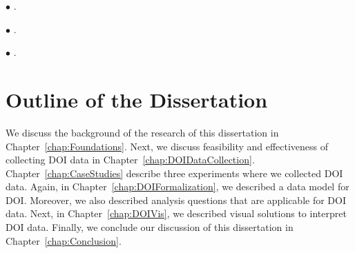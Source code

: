 $\bullet$ .    

$\bullet$ .

$\bullet$ .

\section{Outline of the Dissertation}
We discuss the background of the research of this dissertation in Chapter~\ref{chap:Foundations}. Next, we discuss feasibility and effectiveness of collecting DOI data in Chapter~\ref{chap:DOIDataCollection}. Chapter~\ref{chap:CaseStudies} describe three experiments where we collected DOI data. Again, in Chapter~\ref{chap:DOIFormalization}, we described a data model for DOI. Moreover, we also described analysis questions that are applicable for DOI data. Next, in Chapter~\ref{chap:DOIVis}, we described visual solutions to interpret DOI data. Finally, we conclude our discussion of this dissertation in Chapter~\ref{chap:Conclusion}.
